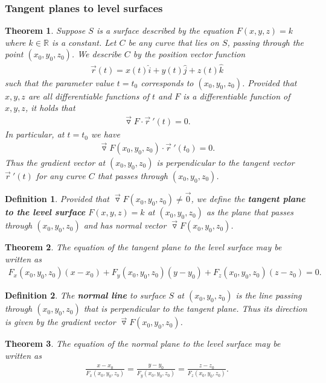 \documentclass{article}
\theoremstyle{sltheorem}
\newtheorem{definition}{Definition}[section]
\newtheorem{theorem}{Theorem}[section]
\newcommand{\R}{\mathbb{R}}
\newcommand{\ih}{\widehat i}
\newcommand{\jh}{\widehat j}
\newcommand{\kh}{\widehat k}
\newcommand{\grad}{\vec\triangledown}
\newcommand{\dv}[1]{\vec #1\:'}
\newcommand*\B[1]{\textbf{#1}}
\begin{document}
\subsubsection{Tangent planes to level surfaces}
\begin{theorem}
    Suppose $S$ is a surface described by the equation $F(x,y,z)=k$ where
    $k\in\R$ is a constant. Let $C$ be any curve that lies on $S$, passing
    through the point $(x_0,y_0,z_0)$. We describe $C$ by the position vector
    function
    \begin{align*}
        \vec r(t) = x(t)\ih + y(t)\jh + z(t)\kh
    \end{align*}
    such that the parameter value $t=t_0$ corresponds to $(x_0, y_0, z_0)$.
    Provided that $x,y,z$ are all differentiable functions of $t$ and $F$
    is a differentiable function of $x,y,z$, it holds that
    \begin{align*}
        \grad F \cdot \dv r(t) = 0.
    \end{align*}
    In particular, at $t=t_0$ we have
    \begin{align*}
        \grad F(x_0, y_0, z_0)\cdot \dv r(t_0) = 0.
    \end{align*}
    Thus the gradient vector at $(x_0, y_0, z_0)$ is perpendicular to the
    tangent vector $\dv r(t)$ for any curve $C$ that passes through 
    $(x_0, y_0, z_0)$.
\end{theorem}
\begin{definition}
    Provided that $\grad F(x_0, y_0, z_0)\not=\vec 0$, we define the
    \B{tangent plane to the level surface} $F(x,y,z)=k$ at $(x_0, y_0, z_0)$
    as the plane that passes through $(x_0, y_0, z_0)$ and has normal vector
    $\grad F(x_0, y_0, z_0)$.
\end{definition}
\begin{theorem}
    The equation of the tangent plane to the level surface may be written as
    \begin{align*}
        F_x(x_0, y_0, z_0)(x-x_0)+F_y(x_0, y_0, z_0)(y-y_0)+F_z(x_0, y_0, z_0)(z-z_0)=0.
    \end{align*}
\end{theorem}
\begin{definition}
    The \B{normal line} to surface $S$ at $(x_0, y_0, z_0)$ is the line
    passing through $(x_0, y_0, z_0)$ that is perpendicular to the tangent
    plane. Thus its direction is given by the gradient vector 
    $\grad F(x_0, y_0, z_0)$.
\end{definition}
\begin{theorem}
    The equation of the normal plane to the level surface may be written as
    \begin{align*}
        \frac{x-x_0}{F_x(x_0, y_0, z_0)}
        =\frac{y-y_0}{F_y(x_0, y_0, z_0)}
        =\frac{z-z_0}{F_z(x_0, y_0, z_0)}.
    \end{align*}
\end{theorem}
\end{document}
